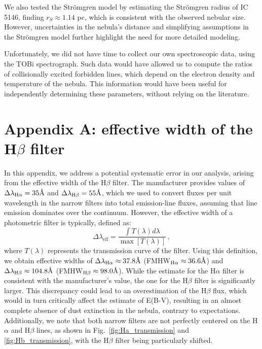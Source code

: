 \documentclass[fleqn,usenatbib]{mnras}
\begin{document}
We also tested the Strömgren model by estimating the Strömgren radius of IC 5146, finding $r_S \approx 1.14$ pc, which is consistent with the observed nebular size.
However, uncertainties in the nebula's distance and simplifying assumptions in the Strömgren model further highlight the need for more detailed modeling.

Unfortunately, we did not have time to collect our own spectroscopic data, using the TOBi spectrograph.
Such data would have allowed us to compute the ratios of collisionally excited forbidden lines, which depend on the electron density and temperature of the nebula.
This information would have been useful for independently determining these parameters, without relying on the literature.



\section{Appendix A: effective width of the H$\beta$ filter}\label{sec:appendix}
In this appendix, we address a potential systematic error in our analysis, arising from the effective width of the H$\beta$ filter.
The manufacturer provides values of $\Delta \lambda_{\text{H}\alpha} = 35 \text{\r{A}}$ and $\Delta \lambda_{\text{H}\beta} = 55 \text{\r{A}}$, which we used to convert fluxes per unit wavelength in the narrow filters into total emission-line fluxes, assuming that line emission dominates over the continuum.
However, the effective width of a photometric filter is typically, defined as:
\begin{equation}
  \Delta \lambda_\text{eff} = \dfrac{\int T(\lambda) d\lambda}{\max[{T(\lambda)}]} \, ,
  \label{eq:effective_width}
\end{equation}
where $T(\lambda)$ represents the transmission curve of the filter.
Using this definition, we obtain effective widths of $\Delta \lambda_{\text{H}\alpha} \approx 37.8 \text{\r{A}}$ (FMHW$_{\text{H}\alpha} \approx 36.6 \text{\r{A}}$) and $\Delta \lambda_{\text{H}\beta} \approx 104.8 \text{\r{A}}$ (FMHW$_{\text{H}\beta} \approx 98.0 \text{\r{A}}$).
While the estimate for the H$\alpha$ filter is consistent with the manufacturer's value, the one for the H$\beta$ filter is significantly larger.
This discrepancy could lead to an overestimation of the H$\beta$ flux, which would in turn critically affect the estimate of E(B-V), resulting in an almost complete absence of dust extinction in the nebula, contrary to expectations.
Additionally, we note that both narrow filters are not perfectly centered on the H$\alpha$ and H$\beta$ lines, as shown in Fig.~\ref{fig:Ha_transmission} and \ref{fig:Hb_transmission}, with the H$\beta$ filter being particularly shifted.
\end{document}
